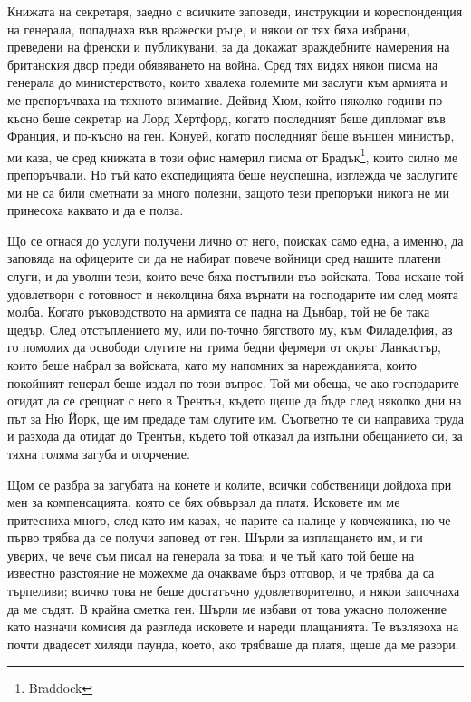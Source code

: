 \documentclass[12pt]{book}
\begin{document}
Книжата на секретаря, заедно с всичките заповеди, инструкции и кореспонденция на генерала, попаднаха във вражески ръце, и някои от тях бяха избрани, преведени на френски и публикувани, за да докажат враждебните намерения на британския двор преди обявяването на война. Сред тях видях някои писма на генерала до министерството, които хвалеха големите ми заслуги към армията и ме препоръчваха на тяхното внимание. Дейвид Хюм, който няколко години по-късно беше секретар на Лорд Хертфорд, когато последният беше дипломат във Франция, и по-късно на ген. Конуей, когато последният беше външен министър, ми каза, че сред книжата в този офис намерил писма от Брадък\footnote{Braddock}, които силно ме препоръчвали. Но тъй като експедицията беше неуспешна, изглежда че заслугите ми не са били сметнати за много полезни, защото тези препоръки никога не ми принесоха каквато и да е полза. 

Що се отнася до услуги получени лично от него, поисках само една, а именно, да заповяда на офицерите си да не набират повече войници сред нашите платени слуги, и да уволни тези, които вече бяха постъпили във войската. Това искане той удовлетвори с готовност и неколцина бяха върнати на господарите им след моята молба. Когато ръководството на армията се падна на Дънбар, той не бе така щедър. След отстъплението му, или по-точно бягството му, към Филаделфия, аз го помолих да освободи слугите на трима бедни фермери от окръг Ланкастър, които беше набрал за войската, като му напомних за нарежданията, които покойният генерал беше издал по този въпрос. Той ми обеща, че ако господарите отидат да се срещнат с него в Трентън, където щеше да бъде след няколко дни на път за Ню Йорк, ще им предаде там слугите им. Съответно те си направиха труда и разхода да отидат до Трентън, където той отказал да изпълни обещанието си, за тяхна голяма загуба и огорчение. 

Щом се разбра за загубата на конете и колите, всички собственици дойдоха при мен за компенсацията, която се бях обвързал да платя. Исковете им ме притесниха много, след като им казах, че парите са налице у ковчежника, но че първо трябва да се получи заповед от ген. Шърли за изплащането им, и ги уверих, че вече съм писал на генерала за това; и че тъй като той беше на известно разстояние не можехме да очакваме бърз отговор, и че трябва да са търпеливи; всичко това не беше достатъчно удовлетворително, и някои започнаха да ме съдят. В крайна сметка ген. Шърли ме избави от това ужасно положение като назначи комисия да разгледа исковете и нареди плащанията. Те възлязоха на почти двадесет хиляди паунда, което, ако трябваше да платя, щеше да ме разори. 
\end{document}
